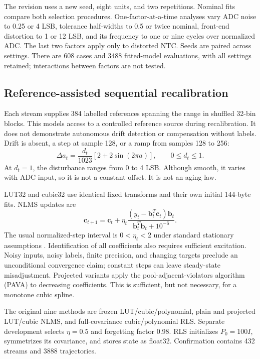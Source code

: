 \documentclass[journal,twoside,web]{ieeecolor}
\begin{document}
The revision uses a new seed, eight units, and two repetitions. Nominal fits compare both selection procedures. One-factor-at-a-time analyses vary ADC noise to 0.25 or 4 LSB, tolerance half-widths to 0.5 or twice nominal, front-end distortion to 1 or 12 LSB, and its frequency to one or nine cycles over normalized ADC. The last two factors apply only to distorted NTC. Seeds are paired across settings. There are 608 cases and 3488 fitted-model evaluations, with all settings retained; interactions between factors are not tested.

\subsection{Reference-assisted sequential recalibration}
\normalcolor
Each stream supplies 384 labelled references spanning the range in shuffled 32-bin blocks. This models access to a controlled reference source during recalibration. It does not demonstrate autonomous drift detection or compensation without labels. Drift is absent, a step at sample 128, or a ramp from samples 128 to 256:
\begin{equation}
 \Delta a_t=\frac{d_t}{1023}[2+2\sin(2\pi a)],\qquad 0\leq d_t\leq1.
 \label{eq:drift}
\end{equation}
At $d_t=1$, the disturbance ranges from 0 to 4 LSB. Although smooth, it varies with ADC input, so it is not a constant offset. It is not an aging law.

LUT32 and cubic32 use identical fixed transforms and their own initial 144-byte fits. NLMS updates are
\begin{equation}
 \boldsymbol c_{t+1}=\boldsymbol c_t+
 \eta_t\frac{(y_t-\boldsymbol b_t^T\boldsymbol c_t)\boldsymbol b_t}
 {\boldsymbol b_t^T\boldsymbol b_t+10^{-6}}.
 \label{eq:nlms}
\end{equation}
The usual normalized-step interval is $0<\eta_t<2$ under standard stationary assumptions \cite{haykin}. Identification of all coefficients also requires sufficient excitation. Noisy inputs, noisy labels, finite precision, and changing targets preclude an unconditional convergence claim; constant steps can leave steady-state misadjustment. Projected variants apply the pool-adjacent-violators algorithm (PAVA) to decreasing coefficients. This is sufficient, but not necessary, for a monotone cubic spline.

The original nine methods are frozen LUT/cubic/polynomial, plain and projected LUT/cubic NLMS, and full-covariance cubic/polynomial RLS. Separate development selects $\eta=0.5$ and forgetting factor 0.98. RLS initializes $P_0=100I$, symmetrizes its covariance, and stores state as float32. Confirmation contains 432 streams and 3888 trajectories.
\end{document}
